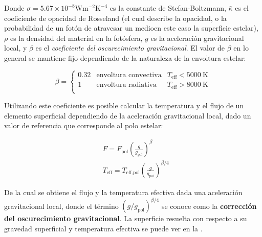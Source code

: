 Donde $\sigma = 5.67 \times 10^{-8} \mathrm{W} \mathrm{m}^{-2} \mathrm{K}^{-4}$
es la constante de Stefan-Boltzmann, $\bar{\kappa}$ es el coeficiente de
opacidad de Rosseland (el cual describe la opacidad, o la probabilidad de un
fotón de atravesar un medio\textemdash en este caso la superficie estelar),
$\rho$ es la densidad del material en la fotósfera, $g$ es la aceleración
gravitacional local, y $\beta$ es el \textit{coeficiente del oscurecimiento
gravitacional}. El valor de $\beta$ en lo general se mantiene fijo dependiendo
de la naturaleza de la envoltura estelar:

\begin{eqfloat}[!ht]
	\centering
	\begin{equation}
		\beta = \left\{\begin{matrix}
			0.32 & \textrm{envoltura convectiva} & T_{\textrm{eff}} < 5000 \ \textrm{K} \\
			1 & \textrm{envoltura radiativa} & T_{\textrm{eff}} > 8000 \ \textrm{K} \\
			\end{matrix}\right. 
	\end{equation}
\end{eqfloat}

Utilizando este coeficiente es posible calcular la temperatura y el flujo de un
elemento superficial dependiendo de la aceleración gravitacional local, dado un
valor de referencia que corresponde al polo estelar:

\begin{eqfloat}[!ht]
	\centering
	\begin{equation}
		\begin{split}
			& F = F_{\textrm{pol}} \left(\frac{g}{g_{\textrm{pol}}}\right)^{\beta} \\
			& T_{\textrm{eff}} = T_{\textrm{eff},\textrm{pol}} \left(\frac{g}{g_{\textrm{pol}}}\right)^{\beta/4}
		\end{split}
	\end{equation}	
\end{eqfloat}

De la cual se obtiene el flujo y la temperatura efectiva dada una aceleración
gravitacional local, donde el término
$\left(g/g_{\mathrm{pol}}\right)^{\beta/4}$ se conoce como la \textbf{corrección
del oscurecimiento gravitacional}. La superficie resuelta con respecto a su
gravedad superficial y temperatura efectiva se puede ver en la
.


